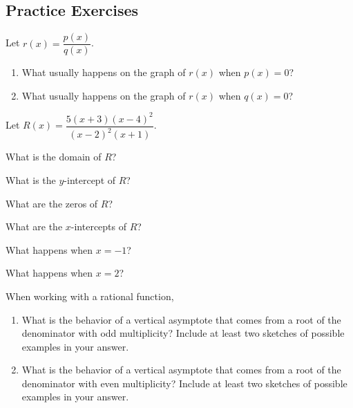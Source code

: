 


\newpage


\subsection*{Practice Exercises} \label{practice-functions-rational-short-term}


\begin{myPractice}
Let $r(x) = \dfrac{p(x)}{q(x)}$.
\begin{enumerate}
	\item What usually happens on the graph of $r(x)$ when $p(x)=0$?
	\vfill
	\item What usually happens on the graph of $r(x)$ when $q(x)=0$?
	\vfill
	\end{enumerate}
\end{myPractice}

\begin{myPractice}
Let $R(x) = \dfrac{5(x+3)(x-4)^2}{(x-2)^2(x+1)}$.  
\begin{enumerate}
\begin{multicols}{2}
\item What is the domain of $R$?
\item What is the $y$-intercept of $R$?
\end{multicols}
\vfill
\begin{multicols}{2}
\item What are the zeros of $R$?
\item What are the $x$-intercepts of $R$?
\end{multicols}
\vfill
\begin{multicols}{2}
\item What happens when $x=-1$?
\item What happens when $x=2$?
\end{multicols}
\vfill

\end{enumerate}
\end{myPractice}

\newpage

\begin{myPractice}
When working with a rational function, 
\begin{enumerate}
	\item What is the behavior of a vertical asymptote that comes from a root of the denominator with odd multiplicity?  Include at least two sketches of possible examples in your answer.
	\vfill
	\item What is the behavior of a vertical asymptote that comes from a root of the denominator with even multiplicity?  Include at least two sketches of possible examples in your answer.
	\vfill
	\end{enumerate}
\end{myPractice}



